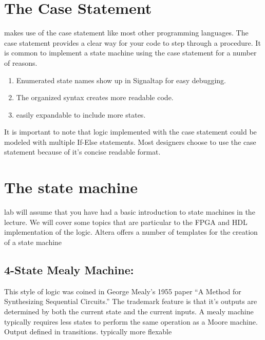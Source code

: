   \section{The Case Statement}
     makes use of the case statement like most other programming languages. The case statement provides a clear way for your code to step through a procedure. It is common to implement a state machine using the case statement for a number of reasons.
    \begin{enumerate}
      \item Enumerated state names show up in Signaltap for easy debugging.
      \item The organized syntax creates more readable code.
      \item easily expandable to include more states.
    \end{enumerate}

    It is important to note that logic implemented with the case statement could be modeled with multiple If-Else statements. Most designers choose to use the case statement because of it's concise readable format.

    

  \section{The state machine}
     lab will assume that you have had a basic introduction to state machines in the lecture. We will cover some topics that are particular to the FPGA and HDL implementation of the logic. Altera offers a number of templates for the creation of a state machine\cite{Altera:QuartusHandbook}
      
      \subsection{4-State Mealy Machine:} This style of logic was coined in George Mealy's 1955 paper “A Method for Synthesizing Sequential Circuits.” The trademark feature is that it's outputs are determined by both the current state and the current inputs. A mealy machine typically requires less states to perform the same operation as a Moore machine. Output defined in transitions. typically more flexable \cite{Wikipedia:MealyMachine}
      
